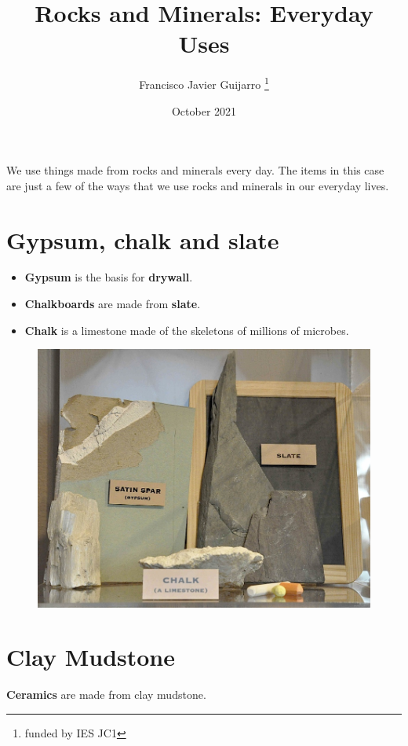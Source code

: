 \documentclass[12pt, letterpaper]{article}
\title{Rocks and Minerals: Everyday Uses}
\author{Francisco Javier Guijarro \thanks{funded by IES JC1}}
\date{October 2021}
\begin{document}
\maketitle
We use things made from rocks and minerals every day. The items in this case are just a few of the ways that we use rocks and minerals in our everyday lives.

\section{Gypsum, chalk and slate}

	\begin{itemize}
		\item \textbf{Gypsum} is the basis for \textbf{drywall}.
		\item \textbf{Chalkboards} are made from \textbf{slate}.
		\item \textbf{Chalk} is a limestone made of the skeletons of millions of microbes.
	\end{itemize}
	
	\begin{figure}[h]
		\includegraphics{shelf01}
		\centering
	\end{figure}
	
\section{Clay Mudstone}

	\par \textbf{Ceramics} are made from clay mudstone.
	
\end{document}
